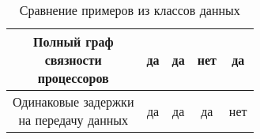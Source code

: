 \begin{table}[!htbp]
\begin{tabular}{c|c|c|c|c}
        \hline
        \makecell{Полный граф                                                                       \\связности\\процессоров}      & да                                         & да     & нет                    & да                     \\
        \hline
        \makecell{Одинаковые задержки                                                               \\на передачу данных} & да                                         & да     & да                     & нет                    \\
    \end{tabular}
    \caption{Сравнение примеров из классов данных}
\end{table}
